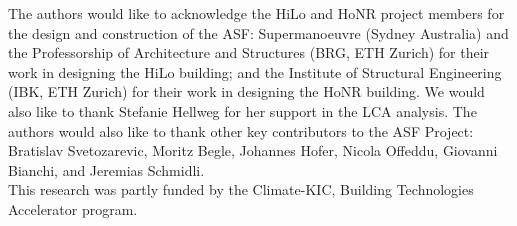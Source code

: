 
The authors would like to acknowledge the HiLo and HoNR project members for the design and construction of the ASF: Supermanoeuvre (Sydney Australia) and the Professorship of Architecture and Structures (BRG, ETH Zurich) for their work in designing the HiLo building; and the Institute of Structural Engineering (IBK, ETH Zurich) for their work in designing the HoNR building. We would also like to thank Stefanie Hellweg for her support in the LCA analysis. The authors would also like to thank other key contributors to the ASF Project: Bratislav Svetozarevic, Moritz Begle, Johannes Hofer, Nicola Offeddu, Giovanni Bianchi, and Jeremias Schmidli. \\

This research was partly funded by the Climate-KIC, Building Technologies Accelerator program.
